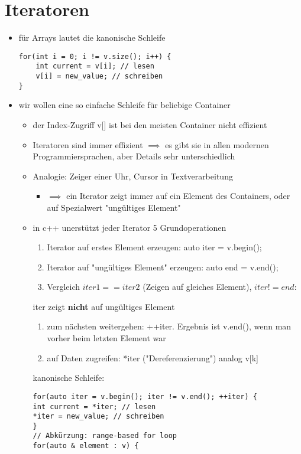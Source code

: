 \documentclass[a4paper]{scrartcl}
\begin{document}
\section{Iteratoren}
\label{sec-12}
\begin{itemize}
\item für Arrays lautet die kanonische Schleife
\begin{verbatim}
for(int i = 0; i != v.size(); i++) {
	int current = v[i]; // lesen
	v[i] = new_value; // schreiben
}
\end{verbatim}
\item wir wollen eine so einfache Schleife für beliebige Container
\begin{itemize}
\item der Index-Zugriff v[] ist bei den meisten Container nicht effizient
\item Iteratoren sind immer effizient $\implies$ es gibt sie in allen modernen Programmiersprachen, aber Details sehr unterschiedlich
\item Analogie: Zeiger einer Uhr, Cursor in Textverarbeitung
\begin{itemize}
\item $\implies$ ein Iterator zeigt immer auf ein Element des Containers, oder auf Spezialwert "ungültiges Element"
\end{itemize}
\item in c++ unerstützt jeder Iterator 5 Grundoperationen
\begin{enumerate}
\item Iterator auf erstes Element erzeugen: auto iter = v.begin();
\item Iterator auf "ungültiges Element" erzeugen: auto end = v.end();
\item Vergleich $iter1 == iter2$ (Zeigen auf gleiches Element), $iter != end$:
\end{enumerate}
iter zeigt \textbf{nicht} auf ungültiges Element
\begin{enumerate}
\item zum nächsten weitergehen: ++iter. Ergebnis ist v.end(), wenn man vorher beim letzten Element war
\item auf Daten zugreifen: *iter ("Dereferenzierung") analog v[k]
\end{enumerate}
kanonische Schleife:
\begin{verbatim}
for(auto iter = v.begin(); iter != v.end(); ++iter) {
int current = *iter; // lesen
*iter = new_value; // schreiben
}
// Abkürzung: range-based for loop
for(auto & element : v) {

\end{verbatim}
\end{itemize}
\end{itemize}
\end{document}
